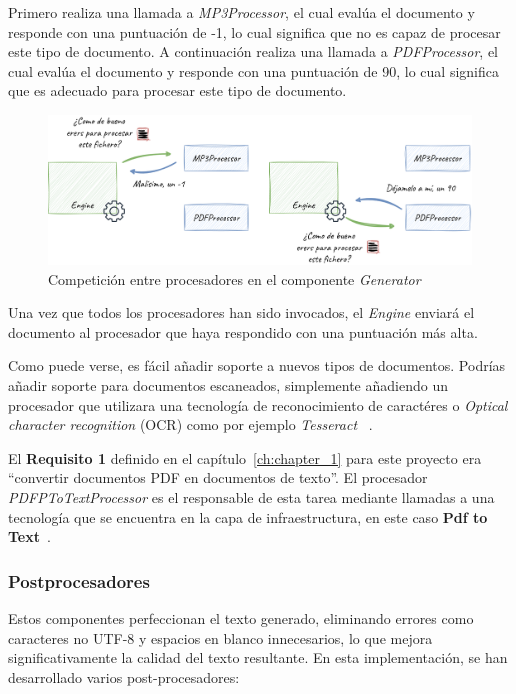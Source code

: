 Primero realiza una llamada a \textit{MP3Processor}, el cual evalúa el documento y responde con una puntuación
de -1, lo cual significa que no es capaz de procesar este tipo de documento.
A continuación realiza una llamada a \textit{PDFProcessor}, el cual evalúa el documento y responde con una puntuación
de 90, lo cual significa que es adecuado para procesar este tipo de documento.

\begin{figure}[ht]
    \begin{center}
        \includegraphics[width=\textwidth]{./chapter/4/images/chapter_4.generator_component_processors}
        \caption{Competición entre procesadores en el componente \textit{Generator}}
        \label{fig:chapter_4.generator_component_processors}
    \end{center}
\end{figure}

Una vez que todos los procesadores han sido invocados, el \textit{Engine} enviará el documento al procesador que
haya respondido con una puntuación más alta.

Como puede verse, es fácil añadir soporte a nuevos tipos de documentos.
Podrías añadir soporte para documentos escaneados, simplemente añadiendo un procesador que utilizara una tecnología
de reconocimiento de caractéres o \textit{Optical character recognition} (OCR) como por ejemplo \textit{Tesseract}
~\cite{https://github.com/tesseract-ocr/tesseract}.

El \textbf{Requisito 1} definido en el capítulo~\ref{ch:chapter_1} para este proyecto era ``convertir documentos PDF
en documentos de texto''.
El procesador \textit{PDFPToTextProcessor} es el responsable de esta tarea mediante llamadas a una tecnología que se
encuentra en la capa de infraestructura, en este caso
\textbf{Pdf to Text}~\cite{https://www.xpdfreader.com/pdftotext-man.html}.

\subsubsection*{Postprocesadores}
Estos componentes perfeccionan el texto generado, eliminando errores como caracteres no UTF-8 y espacios en blanco
innecesarios, lo que mejora significativamente la calidad del texto resultante. En esta implementación, se han
desarrollado varios post-procesadores:

